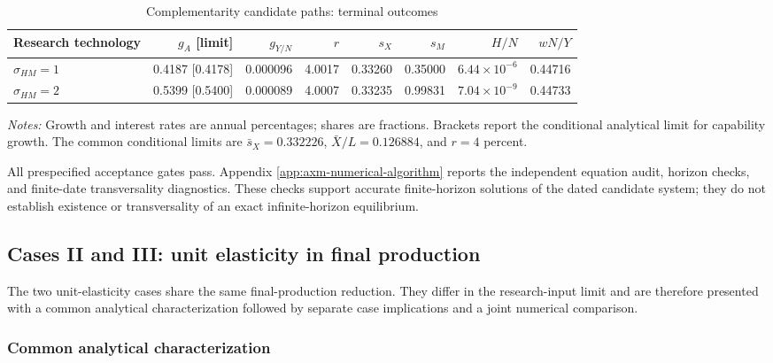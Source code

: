\begin{table}[H]
\centering
\scriptsize
\setlength{\tabcolsep}{3.5pt}
\caption{Complementarity candidate paths: terminal outcomes}
\label{tab:axm-complement-terminal}
\begin{tabular}{lrrrrrrr}
\toprule
Research technology & \(g_A\) [limit] & \(g_{Y/N}\) & \(r\) & \(s_X\) & \(s_M\) & \(H/N\) & \(wN/Y\)\\
\midrule
\(\sigma_{HM}=1\) & 0.4187 [0.4178] & 0.000096 & 4.0017 & 0.33260 & 0.35000 & \(6.44\!\times\!10^{-6}\) & 0.44716\\
\(\sigma_{HM}=2\) & 0.5399 [0.5400] & 0.000089 & 4.0007 & 0.33235 & 0.99831 & \(7.04\!\times\!10^{-9}\) & 0.44733\\
\bottomrule
\end{tabular}

\medskip
\parbox{0.94\textwidth}{\footnotesize \emph{Notes:} Growth and interest rates
are annual percentages; shares are fractions. Brackets report the conditional
analytical limit for capability growth. The common conditional limits are
\(\bar s_X=0.332226\), \(\bar X/L=0.126884\), and \(r=4\) percent.}
\end{table}

All prespecified acceptance gates pass. Appendix
\ref{app:axm-numerical-algorithm} reports the independent equation audit,
horizon checks, and finite-date transversality diagnostics. These checks support
accurate finite-horizon solutions of the dated candidate system; they do not
establish existence or transversality of an exact infinite-horizon equilibrium.

\subsection{Cases II and III: unit elasticity in final production}

The two unit-elasticity cases share the same final-production reduction. They
differ in the research-input limit and are therefore presented with a common
analytical characterization followed by separate case implications and a joint
numerical comparison.

\subsubsection{Common analytical characterization}

